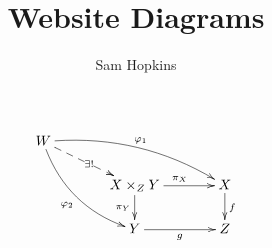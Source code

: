 \documentclass{article}
\title{Website Diagrams}
\author{Sam Hopkins}
\begin{document}
\[
  \xymatrix@R=1.5pc@C=3pc{
    W \ar@{-->}[dr] |(0.5) {\exists !} \ar@/_1pc/[ddr]_{\phi_2} \ar@/^1pc/[drr]^{\phi_1}\\
    & X \times_Z Y \ar[r]^{\pi_X} \ar[d]_{\pi_Y} & X \ar[d]^f \\
    & Y \ar[r]_g & Z\\
   }
\]
\end{document}
